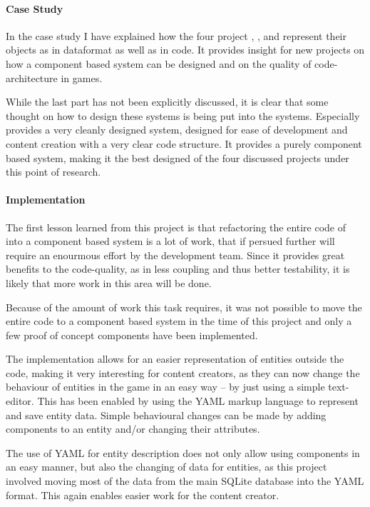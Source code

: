 \paragraph{Case Study}
In the case study I have explained how the four project \UH{}, \BOW{}, \GLEST{} and \AD{} represent their objects as
in dataformat as well as in code. It provides insight for new projects on how a component based system can be designed
and on the quality of code-architecture in \OS{} games.

While the last part has not been explicitly discussed, it is clear that some thought on how to design these systems is
being put into the systems. Especially \AD{} provides a very cleanly designed system, designed for ease of development
and content creation with a very clear code structure.
It provides a purely component based system, making it the best designed of the four discussed projects under this point
of research.

\paragraph{Implementation}
The first lesson learned from this project is that refactoring the entire code of \UH{} into a component based system is
a lot of work, that if persued further will require an enourmous effort by the development team. Since it provides
great benefits to the code-quality, as in less coupling and thus better testability, it is likely that more work in this
area will be done.

Because of the amount of work this task requires, it was not possible to move the entire code to a
component based system in the time of this project and only a few proof of concept components have been implemented.

The implementation allows for an easier representation of entities outside the code, making it very interesting
for content creators, as they can now change the behaviour of entities in the game in an easy way -- by just using a simple
text-editor. This has been enabled by using the YAML markup language to represent and save entity data. Simple
behavioural changes can be made by adding components to an entity and/or changing their attributes.

The use of YAML for entity description does not only allow using components in an easy manner, but also the changing of
data for entities, as this project involved moving most of the data from the main SQLite database into the YAML format.
This again enables easier work for the content creator.

